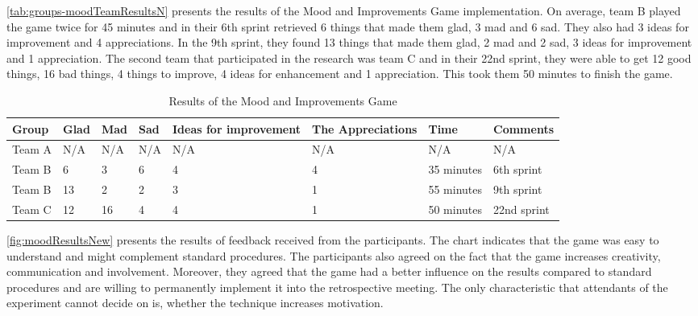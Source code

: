 \autoref{tab:groups-moodTeamResultsN} presents the results of the Mood and Improvements Game implementation. On average, team B played the game twice for 45 minutes and in their 6th sprint retrieved 6 things that made them glad, 3 mad and 6 sad. They also had 3 ideas for improvement and 4 appreciations. In the 9th sprint, they found 13 things that made them glad, 2 mad and 2 sad, 3 ideas for improvement and 1 appreciation. The second team that participated in the research was team C and in their 22nd sprint, they were able to get 12 good things, 16 bad things, 4 things to improve, 4 ideas for enhancement and 1 appreciation. This took them 50 minutes to finish the game.

\begin{table}[!htbp]
	\caption{Results of the Mood and Improvements Game}
	\label{tab:groups-moodTeamResultsN}
	\begin{tabularx}{\textwidth}{|X|X|X|X|X|X|X|X|}
	\hline
		Group & Glad & Mad & Sad & Ideas for improvement & The Appreciations & Time & Comments\\ \hline
		Team A & N/A & N/A & N/A & N/A & N/A & N/A & N/A \\ \hline
		Team B & 6 & 3 & 6 & 4 & 4 & 35 minutes & 6th sprint \\ \hline
		Team B & 13 & 2 & 2 & 3 & 1 & 55 minutes & 9th sprint \\ \hline
		Team C & 12 & 16 & 4 & 4 & 1 & 50 minutes & 22nd sprint\\ \hline
	\end{tabularx}
\end{table}

\autoref{fig:moodResultsNew} presents the results of feedback received from the participants. The chart indicates that the game was easy to understand and might complement standard procedures. The participants also agreed on the fact that the game increases creativity, communication and involvement. Moreover, they agreed that the game had a better influence on the results compared to standard procedures and are willing to permanently implement it into the retrospective meeting. The only characteristic that attendants of the experiment cannot decide on is, whether the technique increases motivation.

